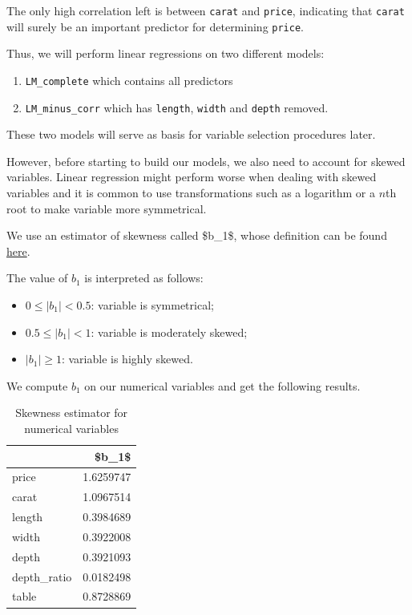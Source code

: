 \documentclass[
  paper=a4,
  ,captions=tableheading
]{scrartcl}
\providecommand{\tightlist}{%
  \setlength{\itemsep}{0pt}\setlength{\parskip}{0pt}}
\begin{document}
The only high correlation left is between \texttt{carat} and
\texttt{price}, indicating that \texttt{carat} will surely be an
important predictor for determining \texttt{price}.

Thus, we will perform linear regressions on two different models:

\begin{enumerate}
\def\labelenumi{\arabic{enumi}.}
\tightlist
\item
  \texttt{LM\_complete} which contains all predictors
\item
  \texttt{LM\_minus\_corr} which has \texttt{length}, \texttt{width} and
  \texttt{depth} removed.
\end{enumerate}

These two models will serve as basis for variable selection procedures
later.

However, before starting to build our models, we also need to account
for skewed variables. Linear regression might perform worse when dealing
with skewed variables and it is common to use transformations such as a
logarithm or a \(n\)th root to make variable more symmetrical.

We use an estimator of skewness called \$b\_1\$, whose definition can be
found
\href{https://en.wikipedia.org/wiki/Skewness\#Sample_skewness}{here}.

The value of \(b_1\) is interpreted as follows:

\begin{itemize}
\tightlist
\item
  \(0 \leq |b_1| < 0.5\): variable is symmetrical;
\item
  \(0.5 \leq |b_1| < 1\): variable is moderately skewed;
\item
  \(|b_1| \geq 1\): variable is highly skewed.
\end{itemize}

We compute \(b_1\) on our numerical variables and get the following
results.

\begin{table}

\caption{\label{tab:skewness-table}Skewness estimator for numerical variables}
\centering
\begin{tabular}[t]{l|r}
\hline
  & \$b\_1\$\\
\hline
price & 1.6259747\\
\hline
carat & 1.0967514\\
\hline
length & 0.3984689\\
\hline
width & 0.3922008\\
\hline
depth & 0.3921093\\
\hline
depth\_ratio & 0.0182498\\
\hline
table & 0.8728869\\
\hline
\end{tabular}
\end{table}
\end{document}
